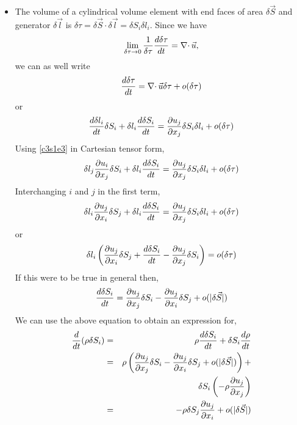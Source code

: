 \begin{itemize}
\item The volume of a cylindrical volume element with end faces of area $\delta\vec{S}$ and generator $\delta\vec{l}$ is $\delta\tau = \delta\vec{S}\cdot\delta\vec{l}=
\delta S_i\delta l_i$.
Since we have
\[
\lim_{\delta\tau \rightarrow 0}\frac{1}{\delta\tau}\frac{d{\delta\tau}}{d{t}} = \operatorname{\nabla\cdot}\vec{u},
\]
we can as well write
\begin{equation}\label{c3s1e4}
\frac{d{\delta\tau}}{d{t}} = \operatorname{\nabla\cdot}\vec{u}\delta\tau + o(\delta\tau)
\end{equation}
or
\[
\frac{d{\delta{l}_i}}{d{t}}\delta S_i + \delta{l}_i\frac{d{\delta{S}_i}}{d{t}} = \frac{\partial{u_j}}{\partial{x_j}}\delta S_i\delta l_i + o(\delta\tau)
\]
Using \eqref{c3s1e3} in Cartesian tensor form,
\[
\delta{l}_j\frac{\partial{u_i}}{\partial{x_j}}\delta S_i + \delta{l}_i\frac{d{\delta{S}_i}}{d{t}} = \frac{\partial{u_j}}{\partial{x_j}}\delta S_i\delta l_i + o(\delta\tau)
\]
Interchanging $i$ and $j$ in the first term,
\[
\delta{l}_i\frac{\partial{u_j}}{\partial{x_i}}\delta S_j + \delta{l}_i\frac{d{\delta{S}_i}}{d{t}} = \frac{\partial{u_j}}{\partial{x_j}}\delta S_i\delta l_i + o(\delta\tau)
\]
or
\[
\delta{l}_i\left(\frac{\partial{u_j}}{\partial{x_i}}\delta S_j + \frac{d{\delta{S}_i}}{d{t}} - \frac{\partial{u_j}}{\partial{x_j}}\delta S_i\right) = o(\delta\tau)
\]
If this were to be true in general then,
\begin{equation}\label{c3s1e5}
\frac{d{\delta{S}_i}}{d{t}} = \frac{\partial{u_j}}{\partial{x_j}}\delta S_i - \frac{\partial{u_j}}{\partial{x_i}}\delta S_j + o(|\delta\vec{S}|)
\end{equation}
We can use the above equation to obtain an expression for,
\begin{eqnarray}
\frac{d}{dt}(\rho\delta S_i) &=& \rho\frac{d{\delta S_i}}{d{t}} + \delta S_i\frac{d{\rho}}{d{t}} \nonumber \\
 &=& \rho\left(\frac{\partial{u_j}}{\partial{x_j}}\delta S_i - \frac{\partial{u_j}}{\partial{x_i}}\delta S_j + o(|\delta\vec{S}|)\right) + \nonumber \\
 & & \delta S_i\left(-\rho\frac{\partial{u_j}}{\partial{x_j}}\right) \nonumber \\
 &=& -\rho\delta S_j \frac{\partial{u_j}}{\partial{x_i}} + o(|\delta\vec{S}|) \label{c3s1e6}
\end{eqnarray}


\end{itemize}
